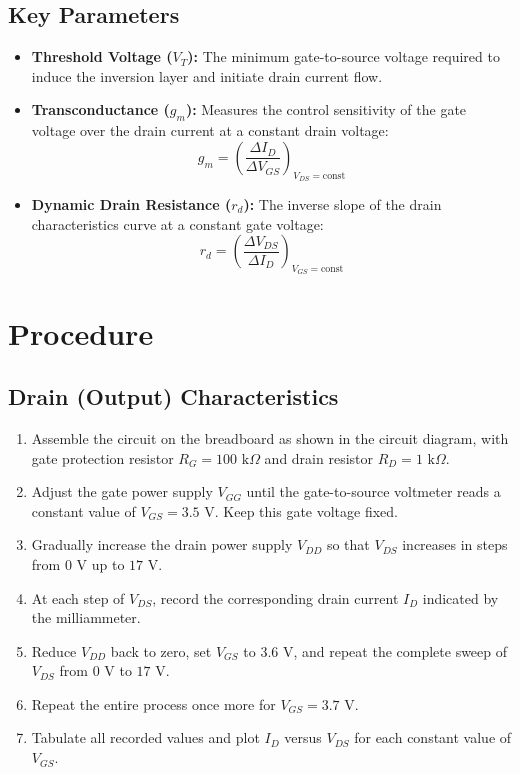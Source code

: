 \documentclass[12pt,a4paper]{article}
\begin{document}
\subsection{Key Parameters}
\begin{itemize}
    \item \textbf{Threshold Voltage ($V_T$):} The minimum gate-to-source voltage required to induce the inversion layer and initiate drain current flow.
    \item \textbf{Transconductance ($g_m$):} Measures the control sensitivity of the gate voltage over the drain current at a constant drain voltage:
    \begin{equation}
        g_m = \left( \frac{\Delta I_D}{\Delta V_{GS}} \right)_{V_{DS} = \text{const}}
    \end{equation}
    \item \textbf{Dynamic Drain Resistance ($r_d$):} The inverse slope of the drain characteristics curve at a constant gate voltage:
    \begin{equation}
        r_d = \left( \frac{\Delta V_{DS}}{\Delta I_D} \right)_{V_{GS} = \text{const}}
    \end{equation}
\end{itemize}

\section{Procedure}

\subsection{Drain (Output) Characteristics}
\begin{enumerate}
    \item Assemble the circuit on the breadboard as shown in the circuit diagram, with gate protection resistor $R_G = 100\text{ k}\Omega$ and drain resistor $R_D = 1\text{ k}\Omega$.
    \item Adjust the gate power supply $V_{GG}$ until the gate-to-source voltmeter reads a constant value of $V_{GS} = 3.5\text{ V}$. Keep this gate voltage fixed.
    \item Gradually increase the drain power supply $V_{DD}$ so that $V_{DS}$ increases in steps from $0\text{ V}$ up to $17\text{ V}$.
    \item At each step of $V_{DS}$, record the corresponding drain current $I_D$ indicated by the milliammeter.
    \item Reduce $V_{DD}$ back to zero, set $V_{GS}$ to $3.6\text{ V}$, and repeat the complete sweep of $V_{DS}$ from $0\text{ V}$ to $17\text{ V}$.
    \item Repeat the entire process once more for $V_{GS} = 3.7\text{ V}$.
    \item Tabulate all recorded values and plot $I_D$ versus $V_{DS}$ for each constant value of $V_{GS}$.
\end{enumerate}
\end{document}
